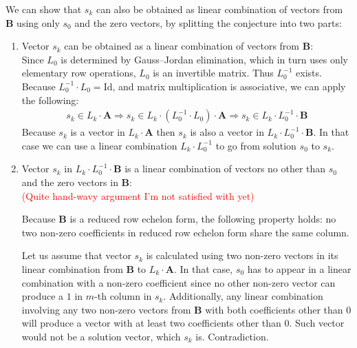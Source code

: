 \begin{description}
    We can show that $s_k$ can also be obtained as linear combination of vectors from $\boldsymbol{B}$ using only $s_0$ and the zero vectors, by splitting the conjecture into two parts:
    \begin{enumerate}
    \item Vector $s_k$ can be obtained as a linear combination of vectors from $\boldsymbol{B}$: \hfill \\
        Since $L_0$ is determined by Gauss--Jordan elimination, which in turn uses only elementary row operations, $L_0$ is an invertible matrix.
        Thus $L_0^{-1}$ exists. Because $L_0^{-1} \cdot L_0 = \mbox{Id}$, and matrix multiplication is associative, we can apply the following:
        \begin{equation}
        \begin{matrix}
            s_k \in L_k \cdot \boldsymbol{A} \Rightarrow s_k \in L_k \cdot (L_0^{-1} \cdot L_0) \cdot \boldsymbol{A} \Rightarrow s_k \in L_k \cdot L_0^{-1} \cdot \boldsymbol{B}
        \end{matrix}
        \end{equation}
        Because $s_k$ is a vector in $L_k \cdot \boldsymbol{A}$ then $s_k$ is also a vector in $L_k \cdot L_0^{-1} \cdot \boldsymbol{B}$.
        In that case we can use a linear combination $L_k \cdot L_0^{-1}$ to go from solution $s_0$ to $s_k$.

    \item Vector $s_k$ in $L_k \cdot L_0^{-1} \cdot \boldsymbol{B}$ is a linear combination of vectors no other than $s_0$ and the zero vectors in $\boldsymbol{B}$:\hfill \\
        \textcolor{red}{(Quite hand-wavy argument I'm not satisfied with yet)}

        Because $\boldsymbol{B}$ is a reduced row echelon form, the following property holds: no two non-zero coefficients in reduced row echelon form share the same column.

        Let us assume that vector $s_k$ is calculated using two non-zero vectors in its linear combination from $\boldsymbol{B}$ to $L_k \cdot \boldsymbol{A}$.
        In that case, $s_0$ has to appear in a linear combination with a non-zero coefficient since no other non-zero vector can produce a $1$ in $m$-th column in $s_k$.
        Additionally, any linear combination involving any two non-zero vectors from $\boldsymbol{B}$ with both coefficients other than $0$ will produce a vector with at least two coefficients other than $0$.
        Such vector would not be a solution vector, which $s_k$ is. Contradiction.
    \end{enumerate}
\end{description}

